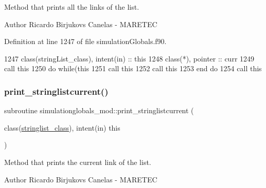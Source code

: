 Method that prints all the links of the list. 

\begin{DoxyAuthor}{Author}
Ricardo Birjukovs Canelas -\/ M\+A\+R\+E\+T\+EC 
\end{DoxyAuthor}


Definition at line 1247 of file simulation\+Globals.\+f90.


\begin{DoxyCode}
1247     \textcolor{keywordtype}{class}(stringList\_class), \textcolor{keywordtype}{intent(in)} :: this
1248     \textcolor{keywordtype}{class}(*), \textcolor{keywordtype}{pointer} :: curr
1249     \textcolor{keyword}{call }this%
1250     \textcolor{keywordflow}{do} \textcolor{keywordflow}{while}(this%
1251         \textcolor{keyword}{call }this%
1252         \textcolor{keyword}{call }this%
1253 \textcolor{keywordflow}{    end do}
1254     \textcolor{keyword}{call }this%
\end{DoxyCode}
\mbox{\label{namespacesimulationglobals__mod_a405f70548e38f0af65d4cbdb7c7025a4}} 
\subsubsection{\texorpdfstring{print\+\_\+stringlistcurrent()}{print\_stringlistcurrent()}}
{\footnotesize\ttfamily subroutine simulationglobals\+\_\+mod\+::print\+\_\+stringlistcurrent (\begin{DoxyParamCaption}\item[{class(\mbox{\hyperlink{structsimulationglobals__mod_1_1stringlist__class}{stringlist\+\_\+class}}), intent(in)}]{this }\end{DoxyParamCaption})\hspace{0.3cm}{\ttfamily [private]}}



Method that prints the current link of the list. 

\begin{DoxyAuthor}{Author}
Ricardo Birjukovs Canelas -\/ M\+A\+R\+E\+T\+EC 
\end{DoxyAuthor}


